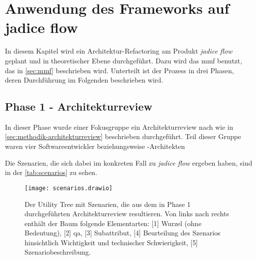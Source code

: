 \chapter{Anwendung des Frameworks auf jadice flow}
\label{chap:anwendung}

In diesem Kapitel wird ein Architektur-Refactoring am Produkt \emph{jadice flow} geplant und in theoretischer Ebene durchgeführt.
Dazu wird das \gls{mmf} benutzt, das in \cref{sec:mmf} beschrieben wird.
Unterteilt ist der Prozess in drei Phasen, deren Durchführung im Folgenden beschrieben wird.

\section{Phase 1 - Architekturreview}

In dieser Phase wurde einer Fokusgruppe ein Architekturreview nach  wie in \cref{sec:methodik-architekturreview} beschrieben durchgeführt.
Teil dieser Gruppe waren vier Softwareentwickler beziehungsweise -Architekten

Die Szenarien, die sich dabei im konkreten Fall zu \emph{jadice flow} ergeben haben, sind in der \cref{tab:scenarios} zu sehen.

\begin{landscape}
	\begin{figure}
		\centering
		\texttt{[image: scenarios.drawio]}
		\caption[Utility Tree mit im Architekturreview ermittelten Qualitätsanforderungen und Szenarien]{
			Der Utility Tree mit Szenarien, die aus dem in Phase 1 durchgeführten Architekturreview resultieren.
			Von links nach rechts enthält der Baum folgende Elementarten: [1] Wurzel (ohne Bedeutung), [2] \gls{qa}, [3] Subattribut, [4] Beurteilung des Szenarios hinsichtlich Wichtigkeit und technischer Schwierigkeit, [5] Szenariobeschreibung.
		}
		\label{fig:scenarios}
	\end{figure}
\end{landscape}



